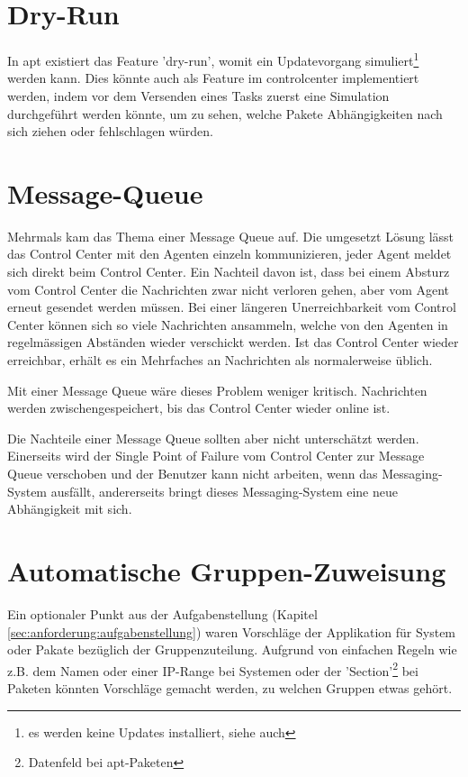 \section{Dry-Run}

In \gls{apt} existiert das Feature 'dry-run', womit ein Updatevorgang simuliert\footnote{es werden keine Updates installiert, siehe auch } werden kann. Dies könnte auch als Feature im \gls{controlcenter} implementiert werden, indem vor dem Versenden eines Tasks zuerst eine Simulation durchgeführt werden könnte, um zu sehen, welche Pakete Abhängigkeiten nach sich ziehen oder fehlschlagen würden.

\section{Message-Queue}
\label{sec:ausblick:message_queue}

Mehrmals kam das Thema einer Message Queue auf. Die umgesetzt Lösung lässt das Control Center mit den Agenten einzeln kommunizieren, jeder Agent meldet sich direkt beim Control Center. Ein Nachteil davon ist, dass bei einem Absturz vom Control Center die Nachrichten zwar nicht verloren gehen, aber vom Agent erneut gesendet werden müssen. Bei einer längeren Unerreichbarkeit vom Control Center können sich so viele Nachrichten ansammeln, welche von den Agenten in regelmässigen Abständen wieder verschickt werden. Ist das Control Center wieder erreichbar, erhält es ein Mehrfaches an Nachrichten als normalerweise üblich. 

Mit einer Message Queue wäre dieses Problem weniger kritisch. Nachrichten werden zwischengespeichert, bis das Control Center wieder online ist.

Die Nachteile einer Message Queue sollten aber nicht unterschätzt werden. Einerseits wird der Single Point of Failure vom Control Center zur Message Queue verschoben und der Benutzer kann nicht arbeiten, wenn das Messaging-System ausfällt, andererseits bringt dieses Messaging-System eine neue Abhängigkeit mit sich.


\section{Automatische Gruppen-Zuweisung}
\label{sec:ausblick:auto_group_assignment}

Ein optionaler Punkt aus der Aufgabenstellung (Kapitel \ref{sec:anforderung:aufgabenstellung}) waren Vorschläge der Applikation für System oder Pakate bezüglich der Gruppenzuteilung. Aufgrund von einfachen Regeln wie z.B. dem Namen oder einer IP-Range bei Systemen oder der 'Section'\footnote{Datenfeld bei apt-Paketen} bei Paketen könnten Vorschläge gemacht werden, zu welchen Gruppen etwas gehört.

